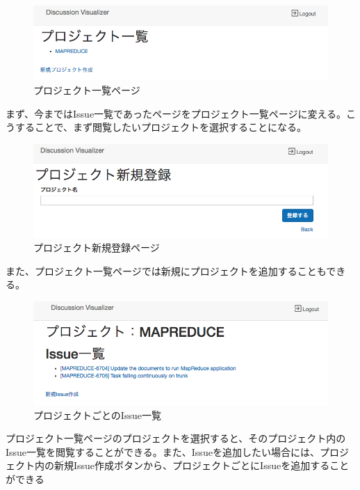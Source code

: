 \documentclass[12pt, oneside]{jreport}
\begin{document}
		\begin{figure}[H]
		\centering
		\includegraphics[width=17cm,bb=700 300 -200 27]{ProjectList.png}
		\caption{プロジェクト一覧ページ}
		\end{figure}
		
		まず、今まではIssue一覧であったページをプロジェクト一覧ページに変える。こうすることで、まず閲覧したいプロジェクトを選択することになる。
			
		\begin{figure}[H]
		\centering
		\includegraphics[width=17cm,bb=500 300 -200 27]{ProjectAdd.png}
		\caption{プロジェクト新規登録ページ}
		\end{figure}
		
		また、プロジェクト一覧ページでは新規にプロジェクトを追加することもできる。
		
		\begin{figure}[H]
		\centering
		\includegraphics[width=17cm,bb=500 300 -200 27]{ProjectIssueList.png}
		\caption{プロジェクトごとのIssue一覧}
		\end{figure}
		
		プロジェクト一覧ページのプロジェクトを選択すると、そのプロジェクト内のIssue一覧を閲覧することができる。また、Issueを追加したい場合には、プロジェクト内の新規Issue作成ボタンから、プロジェクトごとにIssueを追加することができる
		
\end{document}
